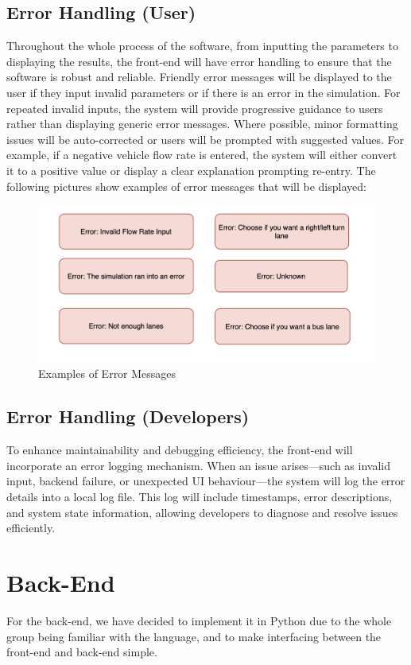 \documentclass{article}
\begin{document}
\subsection{Error Handling (User)}
Throughout the whole process of the software, from inputting the parameters to displaying the results, the front-end will have error handling to ensure that the software is robust and reliable.
Friendly error messages will be displayed to the user if they input invalid parameters or if there is an error in the simulation. For repeated invalid inputs, the system will provide progressive guidance to users rather
than displaying generic error messages. Where possible, minor formatting issues will be
auto-corrected or users will be prompted with suggested values. For example, if a negative
vehicle flow rate is entered, the system will either convert it to a positive value or display a
clear explanation prompting re-entry. The following pictures show examples of error messages that will be displayed:

\begin{figure}[H]
    \centering
    \includegraphics[width=\textwidth]{errormsg.png}
    \caption{Examples of Error Messages}
    \label{errormsg}
\end{figure}

\subsection{Error Handling (Developers)}
To enhance maintainability and debugging efficiency, the front-end will incorporate an error
logging mechanism. When an issue arises—such as invalid input, backend failure, or
unexpected UI behaviour—the system will log the error details into a local log file. This log
will include timestamps, error descriptions, and system state information, allowing
developers to diagnose and resolve issues efficiently.

\section{Back-End}
For the back-end, we have decided to implement it in Python due to the whole group being familiar with the language, and to make 
interfacing between the front-end and back-end simple. 
\end{document}
